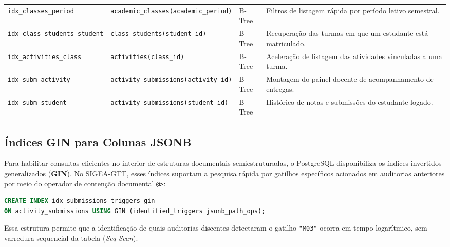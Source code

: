\begin{table}[!ht]
\begin{tabularx}{\textwidth}{p{4.5cm} p{3.9cm} p{1.1cm} X}
\texttt{idx\_classes\_period} & \texttt{academic\_classes}\newline\texttt{(academic\_period)} & B-Tree & Filtros de listagem rápida por período letivo semestral. \\
\texttt{idx\_class\_students\_}\newline\texttt{student} & \texttt{class\_students}\newline\texttt{(student\_id)} & B-Tree & Recuperação das turmas em que um estudante está matriculado. \\
\texttt{idx\_activities\_class} & \texttt{activities}\newline\texttt{(class\_id)} & B-Tree & Aceleração de listagem das atividades vinculadas a uma turma. \\
\texttt{idx\_subm\_activity} & \texttt{activity\_submissions}\newline\texttt{(activity\_id)} & B-Tree & Montagem do painel docente de acompanhamento de entregas. \\
\texttt{idx\_subm\_student} & \texttt{activity\_submissions}\newline\texttt{(student\_id)} & B-Tree & Histórico de notas e submissões do estudante logado. \\
\bottomrule
\end{tabularx}
\end{table}

\subsection{Índices GIN para Colunas JSONB}
Para habilitar consultas eficientes no interior de estruturas documentais semiestruturadas, o PostgreSQL disponibiliza os índices invertidos generalizados (\textbf{GIN}). No SIGEA-GTT, esses índices suportam a pesquisa rápida por gatilhos específicos acionados em auditorias anteriores por meio do operador de contenção documental \texttt{@>}:

\begin{lstlisting}[language=SQL, caption={Criação de Índice GIN para Gatilhos Auditados}]
CREATE INDEX idx_submissions_triggers_gin 
ON activity_submissions USING GIN (identified_triggers jsonb_path_ops);
\end{lstlisting}

Essa estrutura permite que a identificação de quais auditorias discentes detectaram o gatilho \texttt{"M03"} ocorra em tempo logarítmico, sem varredura sequencial da tabela (\textit{Seq Scan}).

